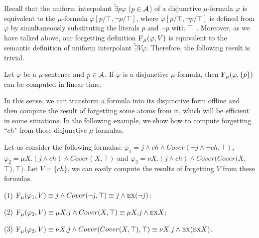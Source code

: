 \documentclass[runningheads]{llncs}
\begin{document}
Recall that the uniform interpolant $\widetilde{\exists}p \varphi$ ($p\in {\cal A}$) of a disjunctive $\mu$-formula $\varphi$ is equivalent to the $\mu$-formula $\varphi[p/\top,\neg p/\top]$, where $\varphi[p/\top,\neg p/\top]$ is defined from $\varphi$ by simultaneously substituting the literals $p$ and $\neg p$ with $\top$~\cite{d2006modal}.
Moreover, as we have talked above, our forgetting definition ${\textsc{F}_{\textsc{$\mu$}}}(\varphi, V)$ is equivalent to the semantic definition of uniform interpolant $\widetilde{\exists}V \varphi$\cite{d2006modal}. 
Therefore, the following result is trivial.
\begin{proposition}
 Let $\varphi$ be a $\mu$-sentence and $p\in {\cal A}$. If $\varphi$ is a disjunctive $\mu$-formula, then ${\textsc{F}_{\textsc{$\mu$}}}(\varphi, \{p\})$ can be computed in linear time.
 \end{proposition}



In this sense, we can transform a formula into its disjunctive form offline and then compute the result of forgetting some atoms from it, which will be efficient in some situations.
In the following example, we show how to compute forgetting ``$ch$" from those disjunctive $\mu$-formulas.

 \begin{example}
 Let us consider the following formulas:
$\varphi_1=  j \wedge ch \wedge Cover(\neg j \wedge \neg ch, \top),$ $ \varphi_2= \mu X. (j \wedge ch) \wedge Cover(X, \top)$ and $\varphi_3=  \nu X. (j \wedge ch) \wedge Cover(Cover(X,$ $\top), \top)$. Let $V=\{ch\}$, we can easily compute the results of forgetting $V$ from these formulas.

(1) ${\textsc{F}_{\textsc{$\mu$}}}(\varphi_1, V) \equiv j \wedge Cover(\neg j, \top) \equiv j \wedge \textsc{e} \textsc{x}(\neg j)$;

(2) ${\textsc{F}_{\textsc{$\mu$}}}(\varphi_2, V) \equiv \mu X. j  \wedge Cover(X, \top) \equiv \mu X. j \wedge \textsc{e} \textsc{x} X$;

(3) ${\textsc{F}_{\textsc{$\mu$}}}(\varphi_2, V) \equiv \nu X. j \wedge Cover(Cover(X, \top), \top) \equiv \nu X. j \wedge \textsc{e} \textsc{x}(\textsc{e} \textsc{x} X)$.
 \end{example}
\end{document}
